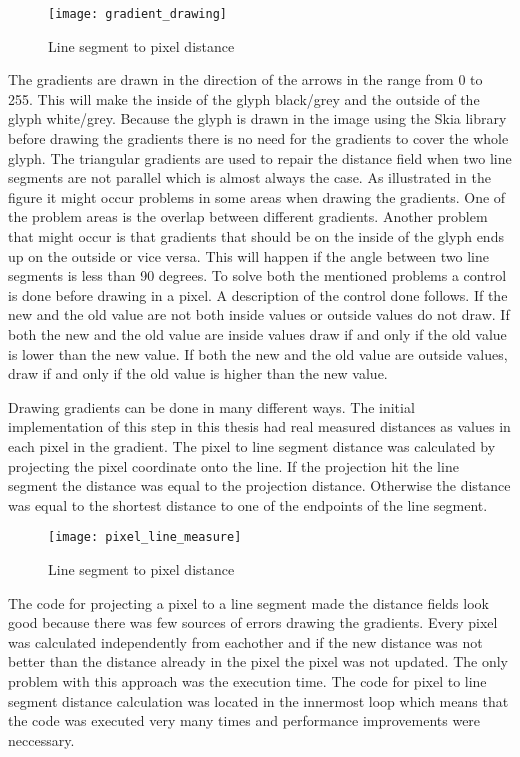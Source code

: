 \begin{figure}[H]
\texttt{[image: gradient\_drawing]}
\caption{Line segment to pixel distance}
\end{figure}

The gradients are drawn in the direction of the arrows in the range from 0 to 255. This will make the inside of the glyph black/grey and the outside of the glyph white/grey. Because the glyph is drawn in the image using the Skia library before drawing the gradients there is no need for the gradients to cover the whole glyph. The triangular gradients are used to repair the distance field when two line segments are not parallel which is almost always the case. As illustrated in the figure it might occur problems in some areas when drawing the gradients. One of the problem areas is the overlap between different gradients. Another problem that might occur is that gradients that should be on the inside of the glyph ends up on the outside or vice versa. This will happen if the angle between two line segments is less than 90 degrees. To solve both the mentioned problems a control is done before drawing in a pixel. A description of the control done follows. If the new and the old value are not both inside values or outside values do not draw. If both the new and the old value are inside values draw if and only if the old value is lower than the new value. If both the new and the old value are outside values, draw if and only if the old value is higher than the new value.

Drawing gradients can be done in many different ways. The initial implementation of this step in this thesis had real measured distances as values in each pixel in the gradient. The pixel to line segment distance was calculated by projecting the pixel coordinate onto the line. If the projection hit the line segment the distance was equal to the projection distance. Otherwise the distance was equal to the shortest distance to one of the endpoints of the line segment.

\begin{figure}[H]
\texttt{[image: pixel\_line\_measure]}
\caption{Line segment to pixel distance}
\end{figure}

The code for projecting a pixel to a line segment made the distance fields look good because there was few sources of errors drawing the gradients. Every pixel was calculated independently from eachother and if the new distance was not better than the distance already in the pixel the pixel was not updated. The only problem with this approach was the execution time. The code for pixel to line segment distance calculation was located in the innermost loop which means that the code was executed very many times and performance improvements were neccessary.

